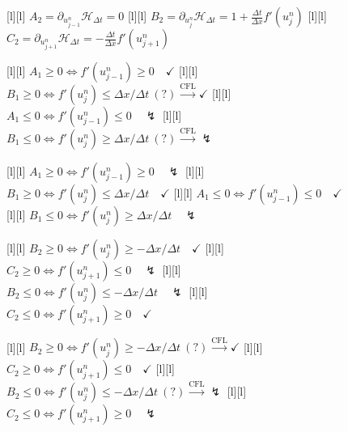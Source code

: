 \begin{figure}[ht]
	[l] {$\displaystyle A_{2} = \partial_{u^{n}_{j-1}} \mathcal{H}_{\Delta t}
			= 0$}
	[l] {$\displaystyle B_{2} = \partial_{u^{n}_{j}} \mathcal{H}_{\Delta t}
			= 1 + \frac{\Delta t}{\Delta x}f'(u^{n}_{j})$}
	[l] {$\displaystyle C_{2} = \partial_{u^{n}_{j+1}} \mathcal{H}_{\Delta t} =
			-\frac{\Delta t}{\Delta x}f'(u^{n}_{j+1})$}

	[l] {$A_{1}\geq 0 \Leftrightarrow f'(u^{n}_{j-1}) \geq 0\quad \checkmark$}
	[l] {$B_{1}\geq 0 \Leftrightarrow f'(u^{n}_{j}) \leq \Delta x/\Delta t \ (?)\stackrel{\text{CFL}}{\rightarrow}\checkmark$}
	[l] {$A_{1}\leq 0 \Leftrightarrow f'(u^{n}_{j-1}) \leq 0\quad \lightning$}
	[l] {$B_{1}\leq 0 \Leftrightarrow f'(u^{n}_{j}) \geq \Delta x/\Delta t \ (?) \stackrel{\text{CFL}}{\rightarrow}\lightning$}

	[l] {$A_{1}\geq 0 \Leftrightarrow f'(u^{n}_{j-1}) \geq 0\quad \lightning$}
	[l] {$B_{1}\geq 0 \Leftrightarrow f'(u^{n}_{j}) \leq \Delta x/\Delta t \quad \checkmark$}
	[l] {$A_{1}\leq 0 \Leftrightarrow f'(u^{n}_{j-1}) \leq 0\quad \checkmark$}
	[l] {$B_{1}\leq 0 \Leftrightarrow f'(u^{n}_{j}) \geq \Delta x/\Delta t \quad \lightning$}

	[l] {$B_{2}\geq 0 \Leftrightarrow f'(u^{n}_{j})\geq-\Delta x/\Delta t \quad \checkmark$}
	[l] {$C_{2}\geq 0 \Leftrightarrow f'(u^{n}_{j+1}) \leq 0 \quad \lightning$}
	[l] {$B_{2}\leq 0 \Leftrightarrow f'(u^{n}_{j})\leq-\Delta x/\Delta t \quad \lightning$}
	[l] {$C_{2}\leq 0 \Leftrightarrow f'(u^{n}_{j+1}) \geq 0 \quad \checkmark$}

	[l] {$B_{2}\geq 0 \Leftrightarrow f'(u^{n}_{j})\geq-\Delta x/\Delta t \ (?) \stackrel{\text{CFL}}{\rightarrow}\checkmark$}
	[l] {$C_{2}\geq 0 \Leftrightarrow f'(u^{n}_{j+1}) \leq 0 \quad \checkmark$}
	[l] {$B_{2}\leq 0 \Leftrightarrow f'(u^{n}_{j})\leq-\Delta x/\Delta t \ (?) \stackrel{\text{CFL}}{\rightarrow} \lightning$}
	[l] {$C_{2}\leq 0 \Leftrightarrow f'(u^{n}_{j+1}) \geq 0 \quad \lightning$}


\end{figure}
